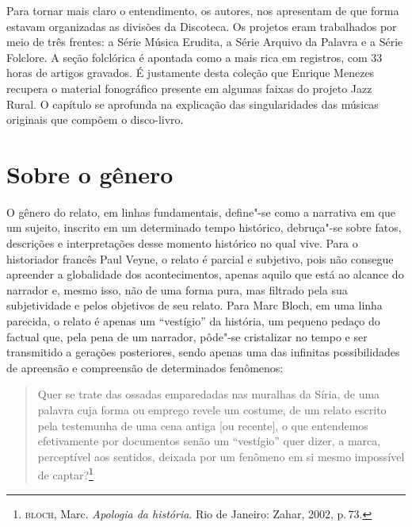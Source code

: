 Para tornar mais claro o entendimento, os autores, nos apresentam de que
forma estavam organizadas as divisões da Discoteca. Os projetos eram
trabalhados por meio de três frentes: a Série Música Erudita, a Série
Arquivo da Palavra e a Série Folclore. A seção folclórica é apontada
como a mais rica em registros, com 33 horas de artigos gravados. É
justamente desta coleção que Enrique Menezes recupera o material
fonográfico presente em algumas faixas do projeto Jazz Rural. O capítulo
se aprofunda na explicação das singularidades das músicas originais que
compõem o disco-livro.


\section{Sobre o gênero}

O gênero do relato, em linhas fundamentais, define"-se como a narrativa em que um sujeito, inscrito em um determinado tempo histórico, debruça"-se sobre fatos, descrições e interpretações desse momento histórico no qual vive. Para o historiador francês Paul Veyne, o relato é parcial e subjetivo, pois não consegue apreender a globalidade dos acontecimentos, apenas
aquilo que está ao alcance do narrador e, mesmo isso, não de uma forma pura, mas filtrado pela sua subjetividade e pelos objetivos de seu relato.
Para Marc Bloch, em uma linha parecida, o relato é apenas um ``vestígio'' da história, um pequeno pedaço do factual que, pela pena de um narrador, pôde"-se cristalizar no tempo e ser transmitido a gerações posteriores, sendo apenas uma das infinitas possibilidades de apreensão e compreensão de determinados fenômenos:

\begin{quote}
Quer se trate das ossadas
emparedadas nas muralhas da Síria, de uma palavra cuja forma ou emprego revele um
costume, de um relato escrito pela testemunha de uma cena antiga [ou recente], o que
entendemos efetivamente por documentos senão um ``vestígio'' quer dizer, a marca,
perceptível aos sentidos, deixada por um fenômeno em si mesmo impossível de captar?\footnote{\textsc{bloch}, Marc. \textit{Apologia da história}. Rio de Janeiro: Zahar, 2002, p.\,73.}
\end{quote}

